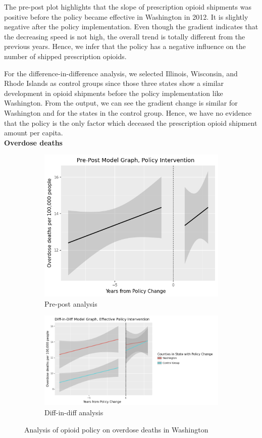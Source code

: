 \documentclass[12pt,letterpaper]{article}
\begin{document}
The pre-post plot highlights that the slope of prescription opioid shipments was positive before the policy became effective in Washington in 2012. It is slightly negative after the policy implementation. Even though the gradient indicates that the decreasing speed is not high, the overall trend is totally different from the previous years. Hence, we infer that the policy has a negative influence on the number of shipped prescription opioids.

For the difference-in-difference analysis, we selected Illinois, Wisconsin, and Rhode Islands as control groups since those three states show a similar development in opioid shipments before the policy implementation like Washington. From the output, we can see the gradient change is similar for Washington and for the states in the control group. Hence, we have no evidence that the policy is the only factor which deceased the prescription opioid shipment amount per capita. \\

\noindent \textbf{Overdose deaths}

\begin{figure}[!h]
\centering
\begin{subfigure}{.5\textwidth}
  \centering
  \includegraphics[width=0.7\linewidth]{../30_results/General_Results/washington_overdose_death_prepost.png}
  \caption{Pre-post analysis}
  \label{fig:wa_death_prepost}
\end{subfigure}%
\begin{subfigure}{.55\textwidth}
  \centering
  \includegraphics[width=1\linewidth]{../30_results/General_Results/washington_overdose_death_diffdiff.png}
  \caption{Diff-in-diff analysis}
  \label{fig:wa_death_did}
\end{subfigure}
\caption{Analysis of opioid policy on overdose deaths in Washington}
\label{fig:wa_death}
\end{figure}
\end{document}
